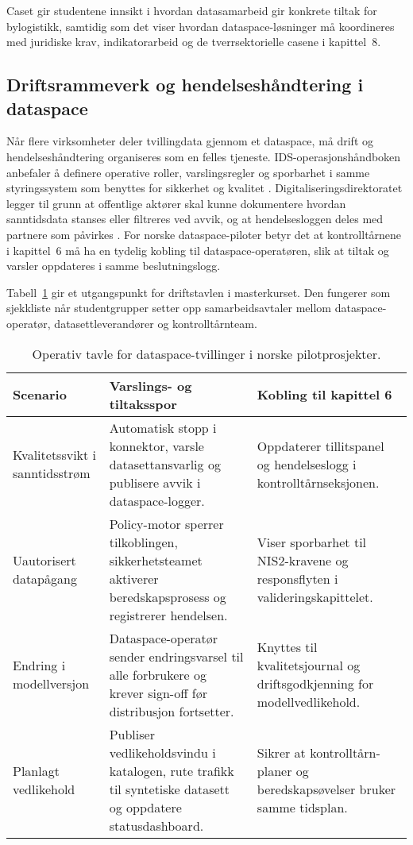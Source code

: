 Caset gir studentene innsikt i hvordan datasamarbeid gir konkrete tiltak for bylogistikk, samtidig som det viser hvordan
dataspace-løsninger må koordineres med juridiske krav, indikatorarbeid og de tverrsektorielle casene i kapittel~8.

\subsection{Driftsrammeverk og hendelseshåndtering i dataspace}
Når flere virksomheter deler tvillingdata gjennom et dataspace, må drift og hendelseshåndtering organiseres som en felles
tjeneste. IDS-operasjonshåndboken anbefaler å definere operative roller, varslingsregler og sporbarhet i samme
styringssystem som benyttes for sikkerhet og kvalitet \citep{idsa2023operational}. Digitaliseringsdirektoratet legger
til grunn at offentlige aktører skal kunne dokumentere hvordan sanntidsdata stanses eller filtreres ved avvik, og at
hendelsesloggen deles med partnere som påvirkes \citep{digdir2024sanntidsdata}. For norske dataspace-piloter betyr det at
kontrolltårnene i kapittel~6 må ha en tydelig kobling til dataspace-operatøren, slik at tiltak og varsler oppdateres i samme
beslutningslogg.

Tabell~\ref{tab:kap03-dataspace-drift} gir et utgangspunkt for driftstavlen i masterkurset. Den fungerer som sjekkliste når
studentgrupper setter opp samarbeidsavtaler mellom dataspace-operatør, datasettleverandører og kontrolltårnteam.

\begin{table}[ht]
    \centering
    \caption{Operativ tavle for dataspace-tvillinger i norske pilotprosjekter.}
    \label{tab:kap03-dataspace-drift}
    \begin{tabular}{p{}p{}p{}}
        \toprule
        \textbf{Scenario} & \textbf{Varslings- og tiltaksspor} & \textbf{Kobling til kapittel 6} \\
        \midrule
        Kvalitetssvikt i sanntidsstrøm & Automatisk stopp i konnektor, varsle datasettansvarlig og publisere avvik i dataspace-logger. & Oppdaterer tillitspanel og hendelseslogg i kontrolltårnseksjonen. \\
        Uautorisert datapågang & Policy-motor sperrer tilkoblingen, sikkerhetsteamet aktiverer beredskapsprosess og registrerer hendelsen. & Viser sporbarhet til NIS2-kravene og responsflyten i valideringskapittelet. \\
        Endring i modellversjon & Dataspace-operatør sender endringsvarsel til alle forbrukere og krever sign-off før distribusjon fortsetter. & Knyttes til kvalitetsjournal og driftsgodkjenning for modellvedlikehold. \\
        Planlagt vedlikehold & Publiser vedlikeholdsvindu i katalogen, rute trafikk til syntetiske datasett og oppdatere statusdashboard. & Sikrer at kontrolltårn-planer og beredskapsøvelser bruker samme tidsplan. \\
        \bottomrule
    \end{tabular}
\end{table}

